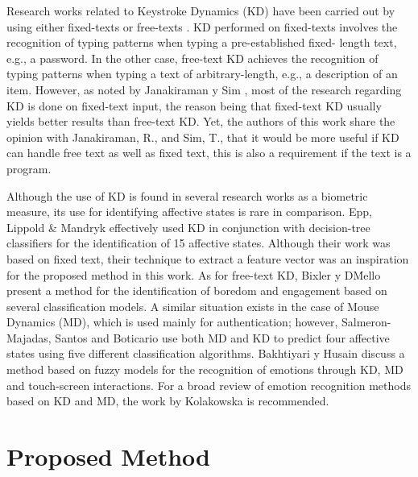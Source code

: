 \documentclass[a4paper,twoside]{article}
\begin{document}
Research works related to Keystroke Dynamics (KD) have been carried out by using either
fixed-texts or free-texts \cite{gunetti2005keystroke}.
KD performed on fixed-texts
involves the recognition of typing patterns when typing a pre-established fixed-
length text, e.g., a password. In the other case, free-text KD achieves the
recognition of typing patterns when typing a text of arbitrary-length, e.g., a
description of an item. However, as noted by Janakiraman y Sim \cite{janakiraman2007keystroke}, most of
the research regarding KD is done on fixed-text input, the reason being that
fixed-text KD usually yields better results than free-text KD. Yet, the authors
of this work share the opinion with Janakiraman, R., and Sim, T., that it would
 be more useful if KD can handle free text as well as fixed text, this is also a
 requirement if the text is a program.

Although the use of KD is found in several research works
as a biometric measure, its use for identifying affective states is rare in
comparison. Epp, Lippold \& Mandryk \cite{epp2011identifying} effectively used KD in conjunction
with decision-tree classifiers for the identification of 15 affective states.
Although their work was based on fixed text, their technique to extract a feature
vector was an inspiration for the proposed method in this work. As for free-text
KD, Bixler y D\'Mello \cite{bixler2013detecting} present a method for the identification of boredom
and engagement based on several classification models. A similar situation exists in the case of Mouse Dynamics (MD), which is used mainly for authentication; however, Salmeron-Majadas, Santos
and Boticario \cite{salmeron2014exploring} use both MD and KD to predict four affective states using
five different classification algorithms. Bakhtiyari y Husain \cite{bakhtiyari2014fuzzy} discuss a
method based on fuzzy models for the recognition of emotions through KD, MD and
touch-screen interactions. For a broad review of emotion recognition methods
based on KD and MD, the work by Kolakowska \cite{kolakowska2013review} is recommended.

\section{Proposed Method}
\label{sec:method}
\end{document}

